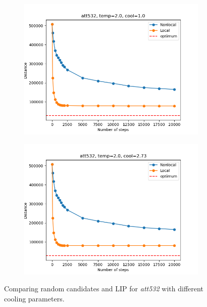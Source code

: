 \begin{figure}[!htb]
	\centering
	\begin{subfigure}{0.45\textwidth}
		\includegraphics[width=\textwidth]{img/att532_temp=2.0_cool=1.0}
	\end{subfigure}
	\begin{subfigure}{0.45\textwidth}
		\includegraphics[width=\textwidth]{img/att532_temp=2.0_cool=2.73}
	\end{subfigure}
	\caption{Comparing random candidates and LIP for \textit{att532} with different cooling parameters.}
	\label{fig:att532_comp}
\end{figure}

